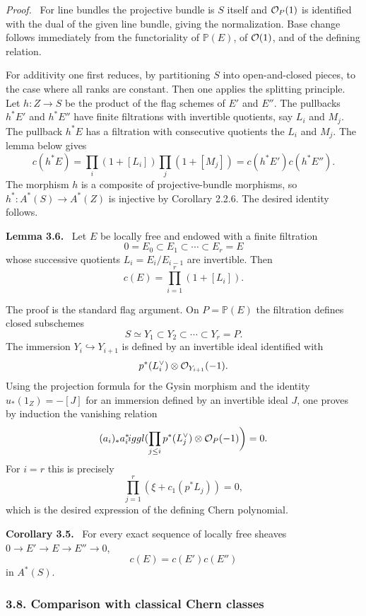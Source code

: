 \documentclass[11pt]{article}
\theoremstyle{plain}
\theoremstyle{definition}
\theoremstyle{remark}
\newenvironment{statement}[1]{\par\medskip\noindent\textbf{#1.}\ }{\par\medskip}
\newenvironment{prooftext}{\par\noindent\textit{Proof.}\ }{\par\medskip}
\begin{document}
\begin{prooftext}
For line bundles the projective bundle is $S$ itself and $\mathcal O_P(1)$ is identified with the dual of the given line bundle, giving the normalization. Base change follows immediately from the functoriality of $\mathbb P(E)$, of $\mathcal O(1)$, and of the defining relation.

For additivity one first reduces, by partitioning $S$ into open-and-closed pieces, to the case where all ranks are constant. Then one applies the splitting principle. Let $h:Z\to S$ be the product of the flag schemes of $E'$ and $E''$. The pullbacks $h^*E'$ and $h^*E''$ have finite filtrations with invertible quotients, say $L_i$ and $M_j$. The pullback $h^*E$ has a filtration with consecutive quotients the $L_i$ and $M_j$. The lemma below gives
\[
   c(h^*E)=\prod_i(1+[L_i])\prod_j(1+[M_j])
       =c(h^*E')c(h^*E'').
\]
The morphism $h$ is a composite of projective-bundle morphisms, so $h^*:A^*(S)\to A^*(Z)$ is injective by Corollary 2.2.6. The desired identity follows.
\end{prooftext}

\begin{statement}{Lemma 3.6}
Let $E$ be locally free and endowed with a finite filtration
\[
   0=E_0\subset E_1\subset\cdots\subset E_r=E
\]
whose successive quotients $L_i=E_i/E_{i-1}$ are invertible. Then
\[
   c(E)=\prod_{i=1}^r(1+[L_i]).
\]
\end{statement}

The proof is the standard flag argument. On $P=\mathbb P(E)$ the filtration defines closed subschemes
\[
   S\simeq Y_1\subset Y_2\subset\cdots\subset Y_r=P.
\]
The immersion $Y_i\hookrightarrow Y_{i+1}$ is defined by an invertible ideal identified with
\[
   p^*(L_i^\vee)\otimes\mathcal O_{Y_{i+1}}(-1).
\]
Using the projection formula for the Gysin morphism and the identity $u_*(1_Z)=-[J]$ for an immersion defined by an invertible ideal $J$, one proves by induction the vanishing relation
\[
   (a_i)_*a_i^*\!iggl(\prod_{j\le i}p^*(L_j^\vee)\otimes\mathcal O_P(-1)\biggr)=0.
\]
For $i=r$ this is precisely
\[
   \prod_{j=1}^r(\xi+c_1(p^*L_j))=0,
\]
which is the desired expression of the defining Chern polynomial.

\begin{statement}{Corollary 3.5}
For every exact sequence of locally free sheaves $0\to E'\to E\to E''\to0$,
\[
   c(E)=c(E')c(E'')
\]
in $A^*(S)$.
\end{statement}

\subsubsection*{3.8. Comparison with classical Chern classes}
\end{document}
